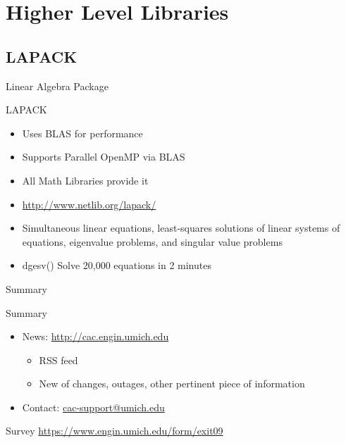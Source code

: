 \documentclass[handout]{beamer}
\begin{document}
\section{Higher Level Libraries}
\subsection{LAPACK}
\begin{frame}{Linear Algebra Package}
 \begin{block}{LAPACK}
  \begin{itemize}
   \item Uses BLAS for performance
   \item Supports Parallel OpenMP via BLAS
   \item All Math Libraries provide it
   \item \url{http://www.netlib.org/lapack/}
   \item Simultaneous linear equations, least-squares solutions of linear systems of equations, eigenvalue problems, and singular value problems
   \item dgesv() Solve 20,000 equations in 2 minutes
  \end{itemize}
 \end{block}
\end{frame}
\begin{frame}{Summary}
 \begin{block}{Summary}
 \begin{itemize}
 \item News: \url{http://cac.engin.umich.edu}
   \begin{itemize}
    \item RSS feed
    \item New of changes, outages, other pertinent piece of information
   \end{itemize}
  \item Contact: \url{cac-support@umich.edu}
 \end{itemize}
 \end{block}
 \begin{block}{Survey}
    \url{https://www.engin.umich.edu/form/exit09}
 \end{block}
\end{frame}
\end{document}

